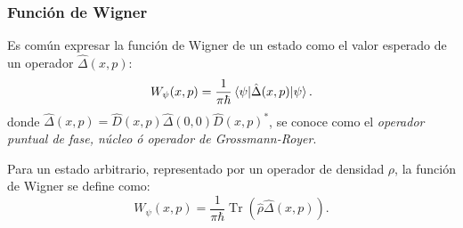 \documentclass[10pt, spanish]{beamer}
\DeclareMathOperator{\R}{\mathbb{R}}
\DeclareMathOperator{\Tr}{Tr}
\begin{document}
  \begin{frame}
    \frametitle{Función de Wigner}

    Es común expresar la función de Wigner de un estado como
    el valor esperado de un operador $\hat\Delta(x,p)$:
    \begin{equation}
      W_\psi(x,p)
      = \frac{1}{\pi \hbar} \braket{\psi|\hat
        \Delta(x,p)|\psi}.
    \end{equation}
    donde $\hat \Delta(x,p) = \hat D(x,p) \hat \Delta(0,0)
    \hat D(x,p)^{*}$, se conoce como el \textit{operador
    puntual de fase, núcleo ó operador de Grossmann-Royer}. 

    \vspace{15pt}

    Para un estado arbitrario, representado por un operador
    de densidad $\rho$, la función de Wigner se define como:
    \begin{equation}
      W_\psi(x,p)
      = \frac{1}{\pi \hbar} \Tr\left( \hat \rho \hat
      \Delta(x,p) \right).
    \end{equation}


  \end{frame}




\end{document}
